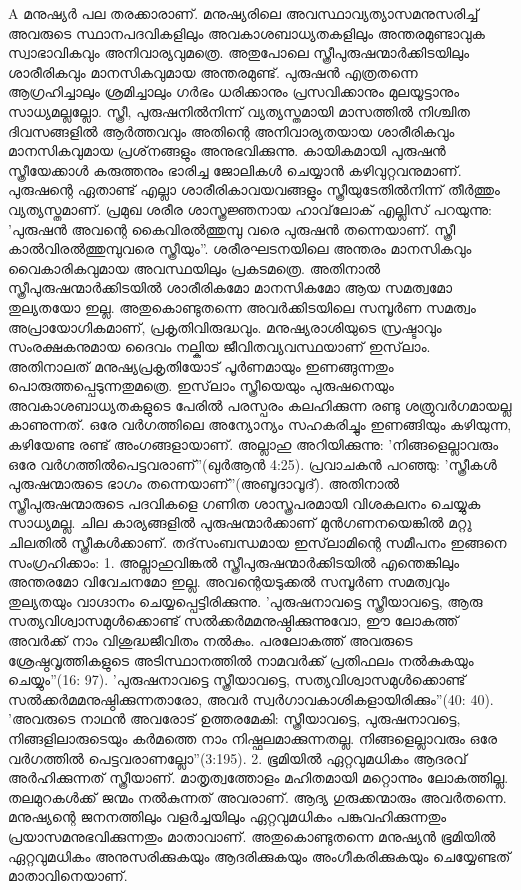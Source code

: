 A മനുഷ്യര്‍ പല തരക്കാരാണ്. മനുഷ്യരിലെ അവസ്ഥാവ്യത്യാസമനുസരിച്ച് അവരുടെ സ്ഥാനപദവികളിലും അവകാശബാധ്യതകളിലും അന്തരമുണ്ടാവുക സ്വാഭാവികവും അനിവാര്യവുമത്രെ. അതുപോലെ സ്ത്രീപുരുഷന്മാര്‍ക്കിടയിലും ശാരീരികവും മാനസികവുമായ അന്തരമുണ്ട്. പുരുഷന്‍ എത്രതന്നെ ആഗ്രഹിച്ചാലും ശ്രമിച്ചാലും ഗര്‍ഭം ധരിക്കാനും പ്രസവിക്കാനും മുലയൂട്ടാനും സാധ്യമല്ലല്ലോ. സ്ത്രീ, പുരുഷനില്‍നിന്ന് വ്യത്യസ്തമായി മാസത്തില്‍ നിശ്ചിത ദിവസങ്ങളില്‍ ആര്‍ത്തവവും അതിന്റെ അനിവാര്യതയായ ശാരീരികവും മാനസികവുമായ പ്രശ്‌നങ്ങളും അനുഭവിക്കുന്നു. കായികമായി പുരുഷന്‍ സ്ത്രീയേക്കാള്‍ കരുത്തനും ഭാരിച്ച ജോലികള്‍ ചെയ്യാന്‍ കഴിവുറ്റവനുമാണ്.
പുരുഷന്റെ ഏതാണ്ട് എല്ലാ ശാരീരികാവയവങ്ങളും സ്ത്രീയുടേതില്‍നിന്ന് തീര്‍ത്തും വ്യത്യസ്തമാണ്. പ്രമുഖ ശരീര ശാസ്ത്രജ്ഞനായ ഹാവ്‌ലോക് എല്ലിസ് പറയുന്നു: 'പുരുഷന്‍ അവന്റെ കൈവിരല്‍ത്തുമ്പു വരെ പുരുഷന്‍ തന്നെയാണ്. സ്ത്രീ കാല്‍വിരല്‍ത്തുമ്പുവരെ സ്ത്രീയും''.
ശരീരഘടനയിലെ അന്തരം മാനസികവും വൈകാരികവുമായ അവസ്ഥയിലും പ്രകടമത്രെ. അതിനാല്‍ സ്ത്രീപുരുഷന്മാര്‍ക്കിടയില്‍ ശാരീരികമോ മാനസികമോ ആയ സമത്വമോ തുല്യതയോ ഇല്ല. അതുകൊണ്ടുതന്നെ അവര്‍ക്കിടയിലെ സമ്പൂര്‍ണ സമത്വം അപ്രായോഗികമാണ്, പ്രകൃതിവിരുദ്ധവും.
മനുഷ്യരാശിയുടെ സ്രഷ്ടാവും സംരക്ഷകനുമായ ദൈവം നല്കിയ ജീവിതവ്യവസ്ഥയാണ് ഇസ്‌ലാം. അതിനാലത് മനുഷ്യപ്രകൃതിയോട് പൂര്‍ണമായും ഇണങ്ങുന്നതും പൊരുത്തപ്പെടുന്നതുമത്രെ. ഇസ്‌ലാം സ്ത്രീയെയും പുരുഷനെയും അവകാശബാധ്യതകളുടെ പേരില്‍ പരസ്പരം കലഹിക്കുന്ന രണ്ടു ശത്രുവര്‍ഗമായല്ല കാണുന്നത്. ഒരേ വര്‍ഗത്തിലെ അന്യോന്യം സഹകരിച്ചും ഇണങ്ങിയും കഴിയുന്ന, കഴിയേണ്ട രണ്ട് അംഗങ്ങളായാണ്. അല്ലാഹു അറിയിക്കുന്നു: 'നിങ്ങളെല്ലാവരും ഒരേ വര്‍ഗത്തില്‍പെട്ടവരാണ്''(ഖുര്‍ആന്‍ 4:25). പ്രവാചകന്‍ പറഞ്ഞു: 'സ്ത്രീകള്‍ പുരുഷന്മാരുടെ ഭാഗം തന്നെയാണ്''(അബൂദാവൂദ്).
അതിനാല്‍ സ്ത്രീപുരുഷന്മാരുടെ പദവികളെ ഗണിത ശാസ്ത്രപരമായി വിശകലനം ചെയ്യുക സാധ്യമല്ല. ചില കാര്യങ്ങളില്‍ പുരുഷന്മാര്‍ക്കാണ് മുന്‍ഗണനയെങ്കില്‍ മറ്റു ചിലതില്‍ സ്ത്രീകള്‍ക്കാണ്. തദ്‌സംബന്ധമായ ഇസ്‌ലാമിന്റെ സമീപനം ഇങ്ങനെ സംഗ്രഹിക്കാം:
1. അല്ലാഹുവിങ്കല്‍ സ്ത്രീപുരുഷന്മാര്‍ക്കിടയില്‍ എന്തെങ്കിലും അന്തരമോ വിവേചനമോ ഇല്ല. അവന്റെയടുക്കല്‍ സമ്പൂര്‍ണ സമത്വവും തുല്യതയും വാഗ്ദാനം ചെയ്യപ്പെട്ടിരിക്കുന്നു.
'പുരുഷനാവട്ടെ സ്ത്രീയാവട്ടെ, ആരു സത്യവിശ്വാസമുള്‍ക്കൊണ്ട് സല്‍ക്കര്‍മമനുഷ്ഠിക്കുന്നുവോ, ഈ ലോകത്ത് അവര്‍ക്ക് നാം വിശുദ്ധജീവിതം നല്‍കും. പരലോകത്ത് അവരുടെ ശ്രേഷ്ഠവൃത്തികളുടെ അടിസ്ഥാനത്തില്‍ നാമവര്‍ക്ക് പ്രതിഫലം നല്‍കുകയും ചെയ്യും''(16: 97). 'പുരുഷനാവട്ടെ സ്ത്രീയാവട്ടെ, സത്യവിശ്വാസമുള്‍ക്കൊണ്ട് സല്‍ക്കര്‍മമനുഷ്ഠിക്കുന്നതാരോ, അവര്‍ സ്വര്‍ഗാവകാശികളായിരിക്കും''(40: 40). 'അവരുടെ നാഥന്‍ അവരോട് ഉത്തരമേകി: സ്ത്രീയാവട്ടെ, പുരുഷനാവട്ടെ, നിങ്ങളിലാരുടെയും കര്‍മത്തെ നാം നിഷ്ഫലമാക്കുന്നതല്ല. നിങ്ങളെല്ലാവരും ഒരേ വര്‍ഗത്തില്‍ പെട്ടവരാണല്ലോ''(3:195).
2. ഭൂമിയില്‍ ഏറ്റവുമധികം ആദരവ് അര്‍ഹിക്കുന്നത് സ്ത്രീയാണ്. മാതൃത്വത്തോളം മഹിതമായി മറ്റൊന്നും ലോകത്തില്ല. തലമുറകള്‍ക്ക് ജന്മം നല്‍കുന്നത് അവരാണ്. ആദ്യ ഗുരുക്കന്മാരും അവര്‍തന്നെ. മനുഷ്യന്റെ ജനനത്തിലും വളര്‍ച്ചയിലും ഏറ്റവുമധികം പങ്കുവഹിക്കുന്നതും പ്രയാസമനുഭവിക്കുന്നതും മാതാവാണ്. അതുകൊണ്ടുതന്നെ മനുഷ്യന്‍ ഭൂമിയില്‍ ഏറ്റവുമധികം അനുസരിക്കുകയും ആദരിക്കുകയും അംഗീകരിക്കുകയും ചെയ്യേണ്ടത് മാതാവിനെയാണ്.
